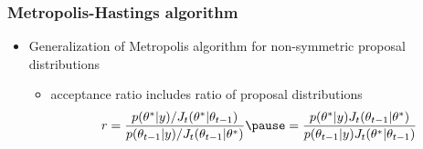 \documentclass[10pt]{beamer}
\begin{document}
\begin{frame}

\frametitle{Metropolis-Hastings algorithm}

  \begin{itemize}
  \item Generalization of Metropolis algorithm for non-symmetric proposal distributions
    \begin{itemize}
    \item acceptance ratio includes ratio of proposal distributions
      \begin{equation*}
        r =
        \frac{p(\theta^{*}|y)/J_t(\theta^{*}|\theta_{t-1})}{p(\theta_{t-1}|y)/J_t(\theta_{t-1}|\theta^{*})} \pause =
        \frac{p(\theta^{*}|y)J_t(\theta_{t-1}|\theta^{*})}{p(\theta_{t-1}|y)J_t(\theta^{*}|\theta_{t-1})}
      \end{equation*}
    \end{itemize}
  \end{itemize}

\end{frame}




\end{document}
